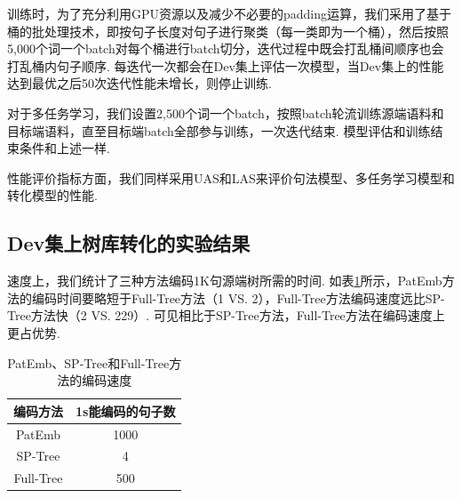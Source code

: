 训练时，为了充分利用GPU资源以及减少不必要的padding运算，我们采用了基于桶的批处理技术，即按句子长度对句子进行聚类（每一类即为一个桶），然后按照5,000个词一个batch对每个桶进行batch切分，迭代过程中既会打乱桶间顺序也会打乱桶内句子顺序. 每迭代一次都会在Dev集上评估一次模型，当Dev集上的性能达到最优之后50次迭代性能未增长，则停止训练.

对于多任务学习，我们设置2,500个词一个batch，按照batch轮流训练源端语料和目标端语料，直至目标端batch全部参与训练，一次迭代结束. 模型评估和训练结束条件和上述一样.

性能评价指标方面，我们同样采用UAS和LAS来评价句法模型、多任务学习模型和转化模型的性能.

\subsection{Dev集上树库转化的实验结果}

速度上，我们统计了三种方法编码1K句源端树所需的时间. 如表\ref{tb:speed}所示，PatEmb方法的编码时间要略短于Full-Tree方法（1 VS. 2），Full-Tree方法编码速度远比SP-Tree方法快（2 VS. 229）. 可见相比于SP-Tree方法，Full-Tree方法在编码速度上更占优势.


\begin{table}[hb!]
    \caption{PatEmb、SP-Tree和Full-Tree方法的编码速度}
    \label{tb:speed}
    \centering
    \begin{tabular}{cc}
        \toprule
        编码方法  & 1s能编码的句子数 \\
        \midrule
        PatEmb    & 1000             \\
        SP-Tree   & 4                \\
        Full-Tree & 500              \\
        \bottomrule
    \end{tabular}
\end{table}

